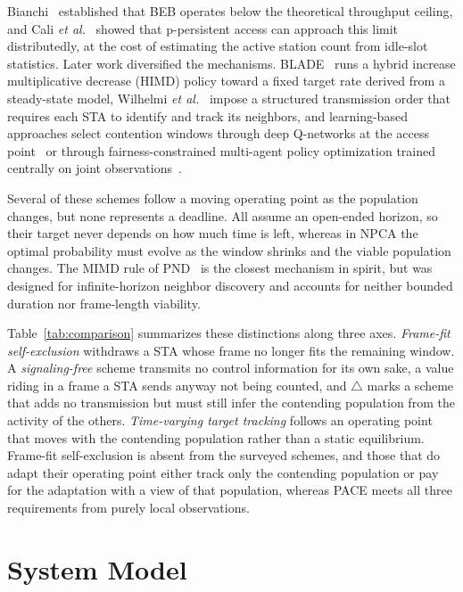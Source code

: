 \documentclass[journal,10pt]{IEEEtran}
\begin{document}
Bianchi~\cite{bianchi2000performance} established that BEB operates below
the theoretical throughput ceiling, and Cali \textit{et al.}~\cite{cali2002dynamic}
showed that p-persistent access can approach this limit distributedly, at
the cost of estimating the active station count from idle-slot statistics.
Later work diversified the mechanisms. BLADE~\cite{guo2026blade} runs a
hybrid increase multiplicative decrease (HIMD) policy toward a fixed target
rate derived from a steady-state model, Wilhelmi
\textit{et al.}~\cite{wilhelmi2025s} impose a structured transmission order
that requires each STA to identify and track its neighbors, and
learning-based approaches select contention windows through deep
Q-networks at the access point~\cite{zuo2025adaptive} or through
fairness-constrained multi-agent policy optimization trained centrally on
joint observations~\cite{pan2025ai}.

Several of these schemes follow a moving operating point as the population
changes, but none represents a deadline. All assume an open-ended horizon,
so their target never depends on how much time is left, whereas in NPCA the
optimal probability must evolve as the window shrinks and the viable
population changes. The MIMD rule of PND~\cite{song2014pnd} is the closest
mechanism in spirit, but was designed for infinite-horizon neighbor
discovery and accounts for neither bounded duration nor frame-length
viability.

Table~\ref{tab:comparison} summarizes these distinctions along three axes.
\emph{Frame-fit self-exclusion} withdraws a STA whose frame no longer fits
the remaining window. A \emph{signaling-free} scheme transmits no control
information for its own sake, a value riding in a frame a STA sends anyway
not being counted, and $\triangle$ marks a scheme that adds no transmission
but must still infer the contending population from the activity of the
others. \emph{Time-varying target tracking} follows an operating point that
moves with the contending population rather than a static equilibrium.
Frame-fit self-exclusion is absent from the surveyed schemes, and those
that do adapt their operating point either track only the contending
population or pay for the adaptation with a view of that population,
whereas PACE meets all three requirements from purely local
observations.

\section{System Model}
\label{sec:system_model}
\end{document}

